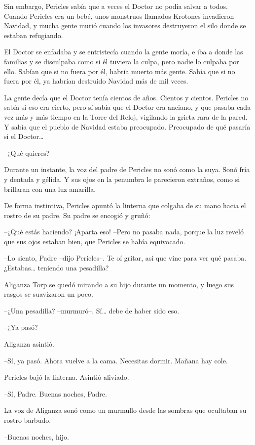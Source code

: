 Sin embargo, Pericles sabía que a veces el Doctor no podía salvar a todos. Cuando Pericles era un bebé, unos monstruos llamados Krotones invadieron Navidad, y mucha gente murió cuando los invasores destruyeron el silo donde se estaban refugiando.

El Doctor se enfadaba y se entristecía cuando la gente moría, e iba a donde las familias y se disculpaba como si él tuviera la culpa, pero nadie lo culpaba por ello. Sabían que si no fuera por él, habría muerto más gente. Sabía que si no fuera por él, ya habrían destruido Navidad más de mil veces.

La gente decía que el Doctor tenía cientos de años. Cientos y cientos. Pericles no sabía si eso era cierto, pero sí sabía que el Doctor era anciano, y que pasaba cada vez más y más tiempo en la Torre del Reloj, vigilando la grieta rara de la pared. Y sabía que el pueblo de Navidad estaba preocupado. Preocupado de qué pasaría si el Doctor…

--¿Qué quieres?

Durante un instante, la voz del padre de Pericles no sonó como la suya. Sonó fría y dentada y gélida. Y sus ojos en la penumbra le parecieron extraños, como si brillaran con una luz amarilla.

De forma instintiva, Pericles apuntó la linterna que colgaba de su mano hacia el rostro de su padre. Su padre se encogió y gruñó:

--¿Qué estás haciendo? ¡Aparta eso! --Pero no pasaba nada, porque la luz reveló que sus ojos estaban bien, que Pericles se había equivocado.

--Lo siento, Padre --dijo Pericles--. Te oí gritar, así que vine para ver qué pasaba. ¿Estabas… teniendo una pesadilla?

Aliganza Torp se quedó mirando a su hijo durante un momento, y luego sus rasgos se suavizaron un poco.

--¿Una pesadilla? --murmuró--. Sí… debe de haber sido eso.

--¿Ya pasó?

Aliganza asintió.

--Sí, ya pasó. Ahora vuelve a la cama. Necesitas dormir. Mañana hay cole.

Pericles bajó la linterna. Asintió aliviado.

--Sí, Padre. Buenas noches, Padre.

La voz de Aliganza sonó como un murmullo desde las sombras que ocultaban su rostro barbudo.

--Buenas noches, hijo.



